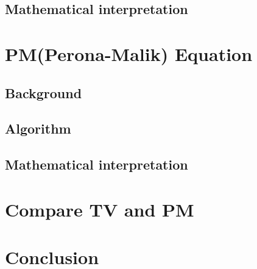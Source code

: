 \documentclass[10pt, openright]{report}
\begin{document}
			\section{Mathematical interpretation}			
		\chapter{PM(Perona-Malik) Equation}
			\section{Background}
			\section{Algorithm}
			\section{Mathematical interpretation}
		\chapter{Compare TV and PM}
		\chapter{Conclusion}		
\end{document}
